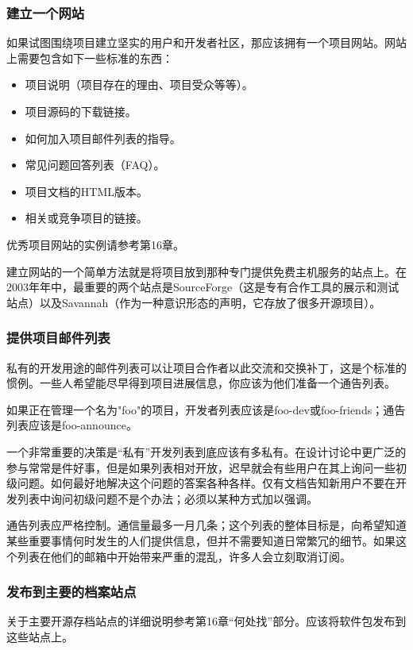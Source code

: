 \documentclass[12pt,oneside]{ctexbook}
\begin{document}
\begin{common-format}
\subsubsection{建立一个网站}
如果试图围绕项目建立坚实的用户和开发者社区，那应该拥有一个项目网站。网站上需要包含如下一些标准的东西：
\begin{itemize}
\item 项目说明（项目存在的理由、项目受众等等）。
\item 项目源码的下载链接。
\item 如何加入项目邮件列表的指导。
\item 常见问题回答列表（FAQ）。
\item 项目文档的HTML版本。
\item 相关或竞争项目的链接。
\end{itemize}

优秀项目网站的实例请参考第16章。

建立网站的一个简单方法就是将项目放到那种专门提供免费主机服务的站点上。在2003年年中，最重要的两个站点是SourceForge（这是专有合作工具的展示和测试站点）以及Savannah（作为一种意识形态的声明，它存放了很多开源顼目）。

\subsubsection{提供项目邮件列表}
私有的开发用途的邮件列表可以让项目合作者以此交流和交换补丁，这是个标准的惯例。一些人希望能尽早得到项目进展信息，你应该为他们准备一个通告列表。

如果正在管理一个名为"foo"的项目，开发者列表应该是foo-dev或foo-friends；通告列表应该是foo-announce。

一个非常重要的决策是“私有”开发列表到底应该有多私有。在设计讨论中更广泛的参与常常是件好事，但是如果列表相对开放，迟早就会有些用户在其上询问一些初级问题。如何最好地解决这个问题的答案各种各样。仅有文档告知新用户不要在开发列表中询问初级问题不是个办法；必须以某种方式加以强调。

通告列表应严格控制。通信量最多一月几条；这个列表的整体目标是，向希望知道某些重要事情何时发生的人们提供信息，但并不需要知道日常繁冗的细节。如果这个列表在他们的邮箱中开始带来严重的混乱，许多人会立刻取消订阅。

\subsubsection{发布到主要的档案站点}
关于主要开源存档站点的详细说明参考第16章“何处找”部分。应该将软件包发布到这些站点上。


\end{common-format}
\end{document}
